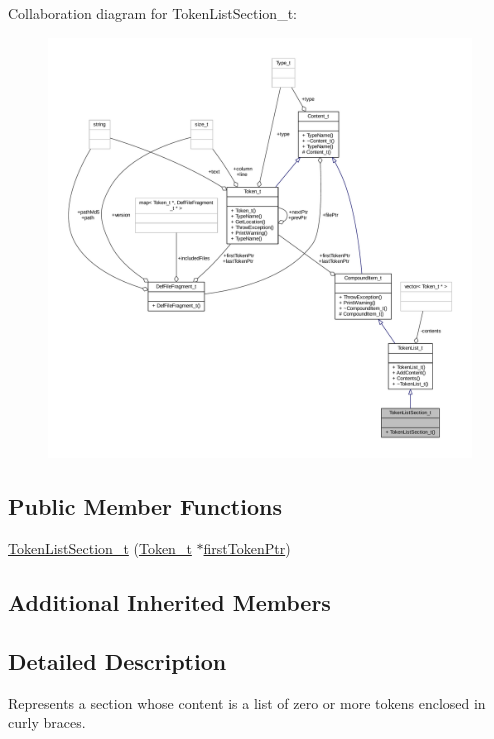 Collaboration diagram for Token\+List\+Section\+\_\+t\+:
\nopagebreak
\begin{figure}[H]
\begin{center}
\leavevmode
\includegraphics[width=350pt]{struct_token_list_section__t__coll__graph}
\end{center}
\end{figure}
\subsection*{Public Member Functions}
\begin{DoxyCompactItemize}
\item 
\hyperlink{struct_token_list_section__t_a33b814646f78d11ca3e70c498d7fd06b}{Token\+List\+Section\+\_\+t} (\hyperlink{struct_token__t}{Token\+\_\+t} $\ast$\hyperlink{struct_compound_item__t_a4d95dc788120f627e332491589d20c5c}{first\+Token\+Ptr})
\end{DoxyCompactItemize}
\subsection*{Additional Inherited Members}


\subsection{Detailed Description}
Represents a section whose content is a list of zero or more tokens enclosed in curly braces. 

